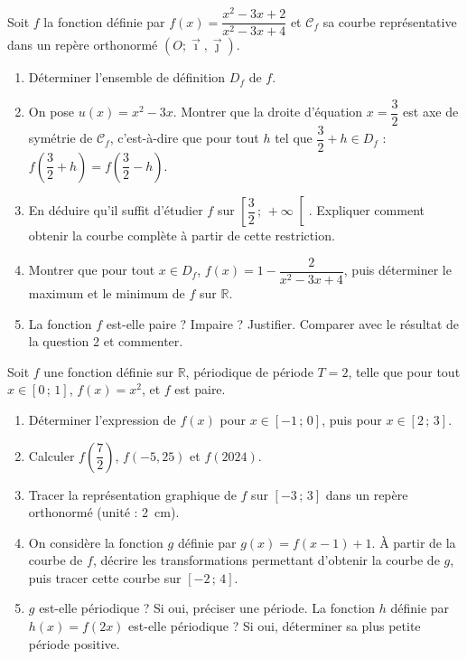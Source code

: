 \documentclass[11pt]{article}
\begin{document}
\begin{exercice}
Soit $f$ la fonction définie par $f(x)=\dfrac{x^{2}-3x+2}{x^{2}-3x+4}$ et $\mathcal{C}_f$ sa courbe représentative dans un repère orthonormé $(O;\vec{\imath},\vec{\jmath})$.
\begin{enumerate}
\item Déterminer l'ensemble de définition $D_f$ de $f$.
\item On pose $u(x)=x^{2}-3x$. Montrer que la droite d'équation $x=\dfrac{3}{2}$ est axe de symétrie de $\mathcal{C}_f$, c'est-à-dire que pour tout $h$ tel que $\dfrac{3}{2}+h\in D_f$ : $f\left(\dfrac{3}{2}+h\right)=f\left(\dfrac{3}{2}-h\right)$.
\item En déduire qu'il suffit d'étudier $f$ sur $\left[\dfrac{3}{2}\,;\,+\infty\right[$. Expliquer comment obtenir la courbe complète à partir de cette restriction.
\item Montrer que pour tout $x\in D_f$, $f(x)=1-\dfrac{2}{x^{2}-3x+4}$, puis déterminer le maximum et le minimum de $f$ sur $\mathbb{R}$.
\item La fonction $f$ est-elle paire ? Impaire ? Justifier. Comparer avec le résultat de la question 2 et commenter.
\end{enumerate}
\end{exercice}

\begin{exercice}
Soit $f$ une fonction définie sur $\mathbb{R}$, périodique de période $T=2$, telle que pour tout $x\in[0\,;\,1]$, $f(x)=x^{2}$, et $f$ est paire.
\begin{enumerate}
\item Déterminer l'expression de $f(x)$ pour $x\in[-1\,;\,0]$, puis pour $x\in[2\,;\,3]$.
\item Calculer $f\left(\dfrac{7}{2}\right)$, $f(-5{,}25)$ et $f(2024)$.
\item Tracer la représentation graphique de $f$ sur $[-3\,;\,3]$ dans un repère orthonormé (unité : \SI{2}{\centi\meter}).
\item On considère la fonction $g$ définie par $g(x)=f(x-1)+1$. À partir de la courbe de $f$, décrire les transformations permettant d'obtenir la courbe de $g$, puis tracer cette courbe sur $[-2\,;\,4]$.
\item $g$ est-elle périodique ? Si oui, préciser une période. La fonction $h$ définie par $h(x)=f(2x)$ est-elle périodique ? Si oui, déterminer sa plus petite période positive.
\end{enumerate}
\end{exercice}
\end{document}
